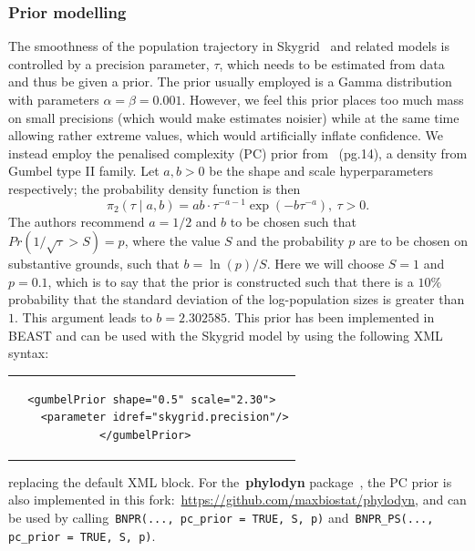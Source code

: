 \documentclass[a4paper,10pt]{article}
\begin{document}
\subsubsection*{Prior modelling}

The smoothness of the population trajectory in Skygrid~\citep{M-Gill2012} and related models is controlled by a precision parameter, $\tau$, which needs to be estimated from data and thus be given a prior.
The prior usually employed is a Gamma distribution with parameters $\alpha = \beta = 0.001$. 
However, we feel this prior places too much mass on small precisions (which would make estimates noisier) while at the same time allowing rather extreme values, which would artificially inflate confidence.
We instead employ the penalised complexity (PC) prior from~\cite{M-Simpson2017} (pg.14), a density from Gumbel type II family.
Let $a, b > 0$ be the shape and scale hyperparameters respectively; the probability density function is then
\begin{equation}
 \pi_2(\tau \mid a, b) = ab \cdot \tau^{-a-1}\exp\left(-b\tau^{-a}\right),\: \tau > 0.
\end{equation}
The authors recommend $a = 1/2$ and $b$ to be chosen such that $Pr(1/\sqrt{\tau} > S) = p$, where the value $S$ and the probability $p$ are to be chosen on substantive grounds, such that $b = \ln(p)/S$.
Here we will choose $S = 1$ and $p = 0.1$, which is to say that the prior is constructed such that there is a $10\%$ probability that the standard deviation of the log-population sizes is greater than $1$.
This argument leads to $b = 2.302585$.
This prior has been implemented in BEAST and can be used with the Skygrid model by using the following XML syntax:
\lstset{language=XML}
\begin{center}
\begin{tabular}{c}
\begin{lstlisting}
<gumbelPrior shape="0.5" scale="2.30">
    <parameter idref="skygrid.precision"/>
</gumbelPrior>	
\end{lstlisting}
\end{tabular}
\end{center}
replacing the default XML block.
For the~\textbf{phylodyn} package~\citep{M-Karcher2017}, the PC prior is also implemented in this fork:~\url{https://github.com/maxbiostat/phylodyn}, and can be used by calling~\verb|BNPR(..., pc_prior = TRUE, S, p)| and~\verb|BNPR_PS(..., pc_prior = TRUE, S, p)|.
\end{document}
